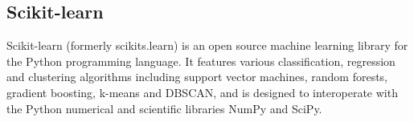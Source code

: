 \subsection{Scikit-learn}

Scikit-learn (formerly scikits.learn) is an open source machine learning library for the Python programming language. It features various classification, regression and clustering algorithms including support vector machines, random forests, gradient boosting, k-means and DBSCAN, and is designed to interoperate with the Python numerical and scientific libraries NumPy and SciPy.